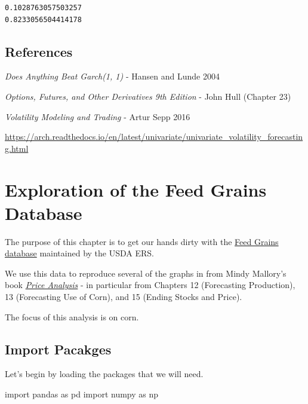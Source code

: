 \documentclass[
  letterpaper,
  DIV=11,
  numbers=noendperiod]{scrreprt}
\newenvironment{Shaded}{\begin{snugshade}}{\end{snugshade}}
\newcommand{\ImportTok}[1]{\textcolor[rgb]{0.00,0.46,0.62}{#1}}
\newcommand{\NormalTok}[1]{\textcolor[rgb]{0.00,0.23,0.31}{#1}}
\begin{document}
\begin{verbatim}
0.1028763057503257
0.8233056504414178
\end{verbatim}

\hypertarget{references}{%
\section{References}\label{references}}

\emph{Does Anything Beat Garch(1, 1)} - Hansen and Lunde 2004

\emph{Options, Futures, and Other Derivatives 9th Edition} - John Hull
(Chapter 23)

\emph{Volatility Modeling and Trading} - Artur Sepp 2016

\url{https://arch.readthedocs.io/en/latest/univariate/univariate_volatility_forecasting.html}

\hypertarget{exploration-of-the-feed-grains-database}{%
\chapter{Exploration of the Feed Grains
Database}\label{exploration-of-the-feed-grains-database}}

The purpose of this chapter is to get our hands dirty with the
\href{https://www.ers.usda.gov/data-products/feed-grains-database/feed-grains-yearbook-tables.aspx\#26780}{Feed
Grains database} maintained by the USDA ERS.

We use this data to reproduce several of the graphs in from Mindy
Mallory's book \href{http://mindymallory.com/PriceAnalysis/}{\emph{Price
Analysis}} - in particular from Chapters 12 (Forecasting Production), 13
(Forecasting Use of Corn), and 15 (Ending Stocks and Price).

The focus of this analysis is on corn.

\hypertarget{import-pacakges}{%
\section{Import Pacakges}\label{import-pacakges}}

Let's begin by loading the packages that we will need.

\begin{Shaded}
\begin{Highlighting}[]
\ImportTok{import}\NormalTok{ pandas }\ImportTok{as}\NormalTok{ pd}
\ImportTok{import}\NormalTok{ numpy }\ImportTok{as}\NormalTok{ np}
\end{Highlighting}
\end{Shaded}
\end{document}
